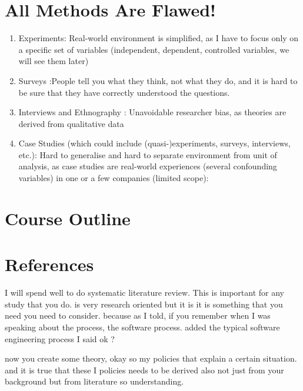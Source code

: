 \documentclass[conference, compsoc, twoside]{IEEEtran}
\begin{document}
\section{All Methods Are Flawed!}
\begin{enumerate}[label*=\arabic*.]
	\item Experiments: Real-world environment is simplified, as I have to focus only on a specific set of variables (independent, dependent, controlled variables, we will see them later)
	\item Surveys :People tell you what they think, not what they do, and it is hard to be sure that they have correctly understood the questions.
	\item Interviews and Ethnography : Unavoidable researcher bias, as theories are derived from qualitative data
	\item Case Studies (which could include (quasi-)experiments, surveys, interviews, etc.): Hard to generalise and hard to separate environment from unit of analysis, as case studies are real-world experiences (several confounding variables) in one or a few companies (limited scope):
\end{enumerate}

 

\section{Course Outline}

\section{References}
I will spend well to do systematic literature review. 
This is important for any study that you do. 
is very research oriented but it is it is something that you need you need to consider. 
because as I told, if you remember when I was speaking about the process, the software process. 
added the typical software engineering process I said ok ? 

now you create some theory, okay so my policies that explain a certain situation. 
and it is true that these I policies needs to be derived also not just from your background but from literature so understanding.
\end{document}
